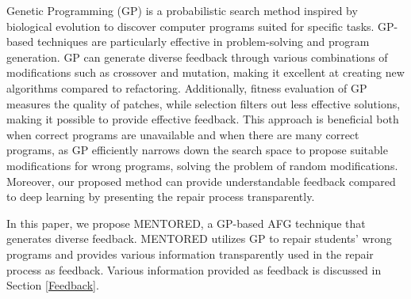 \documentclass[10pt,conference]{IEEEtran}
\begin{document}
    Genetic Programming (GP) is a probabilistic search method inspired by biological evolution to discover computer programs suited for specific tasks\cite{forrest1993genetic,koza1992programming}. GP-based techniques are particularly effective in problem-solving and program generation\cite{le2011genprog,yuan2018arja,eiben2003genetic,cao2023code,harada2024towards}. GP can generate diverse feedback through various combinations of modifications such as crossover and mutation, making it excellent at creating new algorithms compared to refactoring\cite{silva2023automatic}. Additionally, fitness evaluation of GP measures the quality of patches, while selection filters out less effective solutions, making it possible to provide effective feedback. This approach is beneficial both when correct programs are unavailable and when there are many correct programs, as GP efficiently narrows down the search space to propose suitable modifications for wrong programs, solving the problem of random modifications. Moreover, our proposed method can provide understandable feedback compared to deep learning by presenting the repair process transparently.

    In this paper, we propose MENTORED, a GP-based AFG technique that generates diverse feedback. MENTORED utilizes GP to repair students' wrong programs and provides various information transparently used in the repair process as feedback. Various information provided as feedback is discussed in Section \ref{Feedback}.
\end{document}
